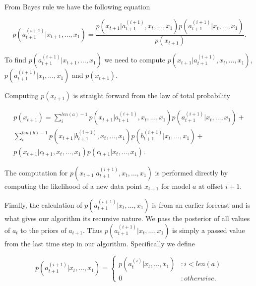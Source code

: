 From Bayes rule we have the following equation 

\begin {equation}
p(a_{t + 1}^{(i + 1)}|x_{t + 1}, \ldots, x_{1}) =
		\frac{p(x_{t + 1}|a^{(i + 1)}_{t + 1}, x_{t}, \ldots, x_{1}) p(a_{t + 1}^{(i + 1)}|x_{t}, \ldots, x_{1})}
	       {p(x_{t + 1})}.
\label{eq:update_bayes}
\end{equation}

To find $p(a_{t + 1}^{(i + 1)}|x_{t + 1}, \ldots, x_{1})$ we need to compute $p(x_{t + 1}|a^{(i + 1)}_{t + 1}, x_{t}, \ldots, x_{1})$,  $p(a_{t + 1}^{(i + 1)}|x_{t}, \ldots, x_{1})$ and $p(x_{t + 1})$.

Computing $p(x_{t + 1})$ is straight forward from the law of total probability

\begin{equation}
	\begin{split}
		p(x_{t + 1}) = \sum_{i}^{len(a) - 1}p(x_{t + 1}|a_{t + 1}^{(i + 1)}, x_{t}, \ldots, x_{1})
						   p(a_{t + 1}^{(i + 1)}|x_{t}, \ldots, x_{1}) + \\
				      \sum_{i}^{len(b) - 1}p(x_{t + 1}|b_{t + 1}^{(i + 1)}, x_{t}, \ldots, x_{1}) 
						   p(b_{t + 1}^{(i + 1)}|x_{t}, \ldots, x_{1}) + \\
	        			      p(x_{t + 1}|c_{t + 1}, x_{t}, \ldots, x_{1})p(c_{t + 1}|x_{t}, \ldots, x_{1}).
	\end{split}
\end{equation}

The computation for $p(x_{t + 1}|a^{(i + 1)}_{t + 1}, x_{t}, \ldots, x_{1})$ is performed directly by computing the likelihood of a new data point $x_{t + 1}$ for model $a$ at offset $i + 1$.

Finally, the calculation of $p(a_{t + 1}^{(i + 1)}|x_{t}, \ldots, x_{1})$ is from an earlier forecast and is what gives our algorithm its recursive nature.  We pass the posterior of all values of $a_{t}$ to the priors of $a_{t + 1}.$  Thus $p(a_{t + 1}^{(i + 1)}|x_{t}, \ldots, x_{1})$ is simply a passed value from the last time step in our algorithm.  Specifically we define 

\begin{equation}
	p(a_{t + 1}^{(i + 1)} | x_{t}, \ldots, x_{1}) = 
		\begin{cases}
			p(a_{t}^{(i)}|x_{t}, \ldots, x_{1}) & : i < len(a) \\
			0 & : otherwise.
		\end{cases}
\end{equation}

